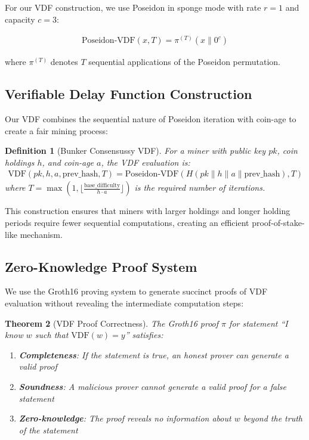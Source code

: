 \documentclass[11pt,a4paper]{article}
\newtheorem{theorem}{Theorem}[section]
\newtheorem{definition}[theorem]{Definition}
\begin{document}
For our VDF construction, we use Poseidon in sponge mode with rate $r = 1$ and capacity $c = 3$:

\begin{align}
\text{Poseidon-VDF}(x, T) = \pi^{(T)}(x \| 0^c)
\end{align}

where $\pi^{(T)}$ denotes $T$ sequential applications of the Poseidon permutation.

\subsection{Verifiable Delay Function Construction}

Our VDF combines the sequential nature of Poseidon iteration with coin-age to create a fair mining process:

\begin{definition}[Bunker Consensussy VDF]
For a miner with public key $pk$, coin holdings $h$, and coin-age $a$, the VDF evaluation is:
\begin{align}
\text{VDF}(pk, h, a, \text{prev\_hash}, T) = \text{Poseidon-VDF}(H(pk \| h \| a \| \text{prev\_hash}), T)
\end{align}
where $T = \max(1, \lfloor \frac{\text{base\_difficulty}}{h \cdot a} \rfloor)$ is the required number of iterations.
\end{definition}

This construction ensures that miners with larger holdings and longer holding periods require fewer sequential computations, creating an efficient proof-of-stake-like mechanism.

\subsection{Zero-Knowledge Proof System}

We use the Groth16 proving system to generate succinct proofs of VDF evaluation without revealing the intermediate computation steps:

\begin{theorem}[VDF Proof Correctness]
The Groth16 proof $\pi$ for statement ``I know $w$ such that $\text{VDF}(w) = y$'' satisfies:
\begin{enumerate}
\item \textbf{Completeness}: If the statement is true, an honest prover can generate a valid proof
\item \textbf{Soundness}: A malicious prover cannot generate a valid proof for a false statement
\item \textbf{Zero-knowledge}: The proof reveals no information about $w$ beyond the truth of the statement
\end{enumerate}
\end{theorem}
\end{document}
